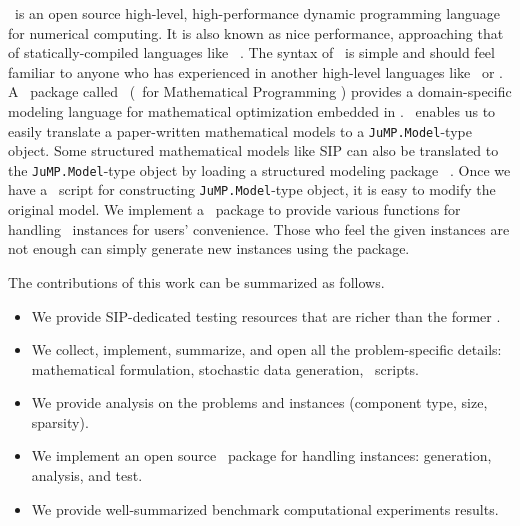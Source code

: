 \julia\ is an open source high-level, high-performance dynamic programming language for numerical computing. It is also known as nice performance, approaching that of statically-compiled languages like \clang\ \cite{journal:BEKS2017}. The syntax of \julia\ is simple and should feel familiar to anyone who has experienced in another high-level languages like \matlab\ or \python. A \julia\ package called \jump\ (\julia\ for Mathematical Programming \cite{web:JuMP}) provides a domain-specific modeling language for mathematical optimization embedded in \julia. \jump\ enables us to easily translate a paper-written mathematical models to a \texttt{JuMP.Model}-type object. Some structured mathematical models like SIP can also be translated to the \texttt{JuMP.Model}-type object by loading a structured modeling package \structjump\ \cite{web:StructJuMP}. Once we have a \julia\ script for constructing \texttt{JuMP.Model}-type object, it is easy to modify the original model. %
We implement a \julia\ package to provide various functions for handling \siplibtwo\ instances for users' convenience. Those who feel the given instances are not enough can simply generate new instances using the package.


The contributions of this work can be summarized as follows.
\begin{itemize}
	\item We provide SIP-dedicated testing resources that are richer than the former \siplib.
	\item We collect, implement, summarize, and open all the problem-specific details: mathematical formulation, stochastic data generation, \julia\ scripts.
	\item We provide analysis on the problems and instances (component type, size, sparsity).
	\item We implement an open source \julia\ package for handling instances: generation, analysis, and test.
	\item We provide well-summarized benchmark computational experiments results.
\end{itemize}

